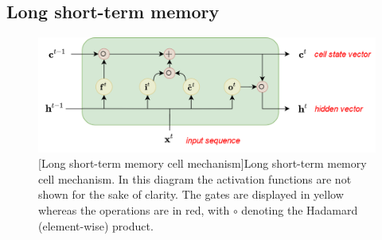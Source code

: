 \subsection{Long short-term memory}
\label{ss:lstm}

\begin{figure}[t]
    \begin{center}
    \includegraphics[width=1.\linewidth]{Images/chap3/lstm.png}
    [Long short-term memory cell mechanism]{Long short-term memory cell mechanism. In this diagram the activation functions are not shown for the sake of clarity. The gates are displayed in yellow whereas the operations are in red, with $\circ$ denoting the Hadamard (element-wise) product.}
    \label{fig:lstm}
    \end{center}
\end{figure}

